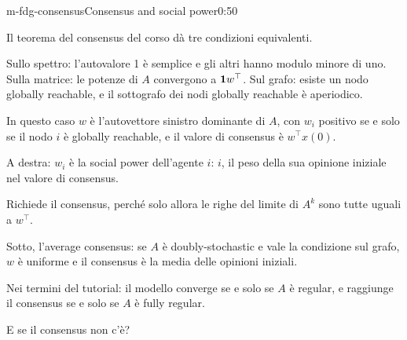 \begin{slide}{m-fdg-consensus}{Consensus and social power}{0:50}
  \begin{discorso}
    \item Il teorema del {\color{red}} {\color{blue}consensus} del corso dà tre condizioni equivalenti.
    \item Sullo spettro: l'autovalore 1 è semplice e gli altri hanno modulo minore di uno. Sulla matrice: le potenze di $A$ convergono a $\mathbf{1} w^\top$. Sul grafo: esiste un nodo globally reachable, e il sottografo dei nodi globally reachable è aperiodico.
    \item In questo caso $w$ è l'autovettore sinistro dominante di $A$, con $w_i$ positivo se e solo se il nodo $i$ è globally reachable, e il valore di {\color{red}} {\color{blue}consensus} è $w^\top x(0)$.
    \item {\color{blue}A destra:} $w_i$ è la social power dell'agente {\color{red}$i$:} {\color{blue}$i$,} il peso della sua opinione iniziale nel valore di {\color{red}} {\color{blue}consensus.}
    \item Richiede il {\color{red}} {\color{blue}consensus,} perché solo allora le righe del limite di $A^k$ sono tutte uguali a $w^\top$.
    \item {\color{red}} {\color{blue}Sotto, l'average consensus: se} $A$ è doubly-stochastic e vale la condizione sul grafo, $w$ è uniforme e il {\color{red}} {\color{blue}consensus} è la media delle opinioni iniziali.
    \item Nei termini del tutorial: il modello converge se e solo se $A$ è regular, e raggiunge il {\color{red}} {\color{blue}consensus} se e solo se $A$ è fully regular.
    \item E se il {\color{red}} {\color{blue}consensus} non c'è?
  \end{discorso}
\end{slide}

